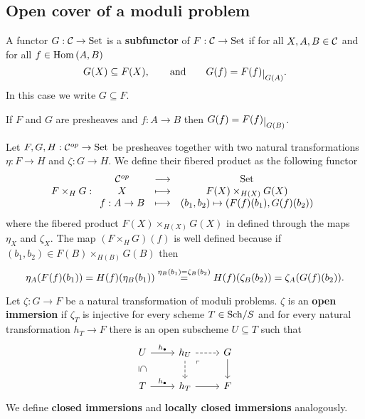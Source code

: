 \subsection{Open cover of a moduli problem}
\begin{definition}[Subfunctor]
A functor $G:\Cc\to \Set$ is a \textbf{subfunctor} of $F:\Cc\to \Set$ if for all $X,A,B\in \Cc$ and for all $f\in \Hom(A,B)$
\[G(X)\subseteq F(X),\qquad\text{and}\qquad G(f)=F(f)\res{G(A)}.\]
In this case we write $G\subseteq F$.
\end{definition}
\begin{remark}
If $F$ and $G$ are presheaves and $f:A\to B$ then $G(f)=F(f)\res{G(B)}$.
\end{remark}

\begin{definition}
Let $F,G,H:\Cc\op\to\Set$ be presheaves together with two natural transformations $\eta:F\to H$ and $\zeta:G\to H$. We define their fibered product as the following functor
\[F\times_H G:\functorDef{\Cc\op}{\Set}{X}{F(X)\times_{H(X)}G(X)}{f:A\to B}{(b_1,b_2)\mapsto(F(f)(b_1),G(f)(b_2))}\]
where the fibered product $F(X)\times_{H(X)}G(X)$ in defined through the maps $\eta_X$ and $\zeta_X$. The map $(F\times_H G)(f)$ is well defined because if $(b_1,b_2)\in F(B)\times_{H(B)}G(B)$ then 
\[\eta_A(F(f)(b_1))=H(f)(\eta_B(b_1))\pasgnlmath={\eta_B(b_1)=\zeta_B(b_2)}H(f)(\zeta_B(b_2))=\zeta_A(G(f)(b_2)).\]
\end{definition}

\begin{definition}
Let $\zeta:G\to F$ be a natural transformation of moduli problems. $\zeta$ is an \textbf{open immersion} if $\zeta_T$ is injective for every scheme $T\in\Sch S$ and for every natural transformation $h_T\to F$ there is an open subscheme $U\subseteq T$ such that
\[\begin{tikzcd}
	U & {h_{U}} & G \\
	T & {h_T} & F
	\arrow["\yo", from=1-1, to=1-2]
	\arrow["\subseteq"{marking, allow upside down}, draw=none, from=1-1, to=2-1]
	\arrow[dashed, from=1-2, to=1-3]
	\arrow[dashed, from=1-2, to=2-2]
	\arrow["\ulcorner"{anchor=center, pos=0.125}, draw=none, from=1-2, to=2-3]
	\arrow[from=1-3, to=2-3]
	\arrow["\yo", from=2-1, to=2-2]
	\arrow[from=2-2, to=2-3]
\end{tikzcd}\]
We define \textbf{closed immersions} and \textbf{locally closed immersions} analogously.
\end{definition}

